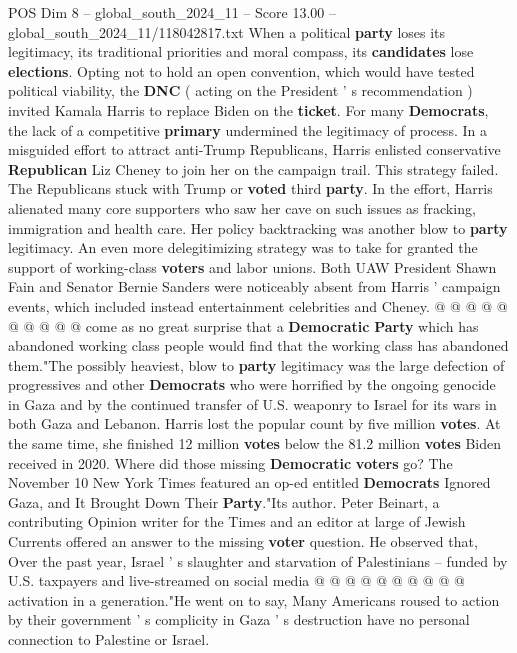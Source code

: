 \begin{textsample}{POS Dim 8 – global\_south\_2024\_11 – Score 13.00 – global\_south\_2024\_11/118042817.txt}  \label{ex:f8_pos_139}
When a political \textbf{party} loses its legitimacy, its traditional priorities and moral compass, its \textbf{candidates} lose \textbf{elections}.
Opting not to hold an open convention, which would have tested political viability, the \textbf{DNC} ( acting on the President ' s recommendation ) invited Kamala Harris to replace Biden on the \textbf{ticket}.
For many \textbf{Democrats}, the lack of a competitive \textbf{primary} undermined the legitimacy of process.
In a misguided effort to attract anti-Trump Republicans, Harris enlisted conservative \textbf{Republican} Liz Cheney to join her on the campaign trail.
This strategy failed.
The Republicans stuck with Trump or \textbf{voted} third \textbf{party}.
In the effort, Harris alienated many core supporters who saw her cave on such issues as fracking, immigration and health care.
Her policy backtracking was another blow to \textbf{party} legitimacy.
An even more delegitimizing strategy was to take for granted the support of working-class \textbf{voters} and labor unions.
Both UAW President Shawn Fain and Senator Bernie Sanders were noticeably absent from Harris ' campaign events, which included instead entertainment celebrities and Cheney. @ @ @ @ @ @ @ @ @ @ come as no great surprise that a \textbf{Democratic} \textbf{Party} which has abandoned working class people would find that the working class has abandoned them."The possibly heaviest, blow to \textbf{party} legitimacy was the large defection of progressives and other \textbf{Democrats} who were horrified by the ongoing genocide in Gaza and by the continued transfer of U.S. weaponry to Israel for its wars in both Gaza and Lebanon.
Harris lost the popular count by five million \textbf{votes}.
At the same time, she finished 12 million \textbf{votes} below the 81.2 million \textbf{votes} Biden received in 2020.
Where did those missing \textbf{Democratic} \textbf{voters} go?
The November 10 New York Times featured an op-ed entitled \textbf{Democrats} Ignored Gaza, and It Brought Down Their \textbf{Party}."Its author.
Peter Beinart, a contributing Opinion writer for the Times and an editor at large of Jewish Currents offered an answer to the missing \textbf{voter} question.
He observed that, Over the past year, Israel ' s slaughter and starvation of Palestinians -- funded by U.S. taxpayers and live-streamed on social media @ @ @ @ @ @ @ @ @ @ activation in a generation."He went on to say, Many Americans roused to action by their government ' s complicity in Gaza ' s destruction have no personal connection to Palestine or Israel.

\end{textsample}
